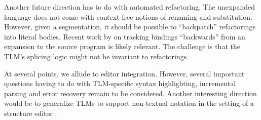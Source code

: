 \documentclass[acmsmall]{acmart}
\begin{document}

Another future direction has to do with automated refactoring. The unexpanded language does not come with context-free notions of renaming and substitution. However, given a segmentation, it should be possible to ``backpatch'' refactorings into literal bodies. Recent work by \citet{wand2017inferring} on tracking bindings ``backwards'' from an expansion to the source program is likely relevant. The challenge is that the TLM's splicing logic might not be invariant to refactorings.

At several points, we allude to editor integration. However, several important questions having to do with TLM-specific syntax highlighting, incremental parsing and error recovery \cite{graham1979practical} remain to be considered. Another interesting direction would be to generalize TLMs to support non-textual notation in the setting of a structure editor \cite{DBLP:conf/popl/OmarVHAH17,snapl17}.


\end{document}
